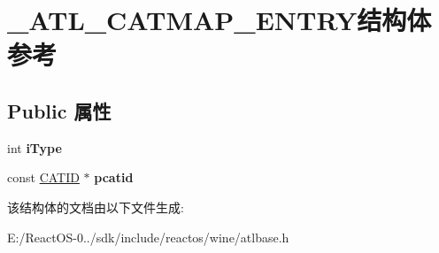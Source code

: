 \hypertarget{struct___a_t_l___c_a_t_m_a_p___e_n_t_r_y}{}\section{\+\_\+\+A\+T\+L\+\_\+\+C\+A\+T\+M\+A\+P\+\_\+\+E\+N\+T\+R\+Y结构体 参考}
\label{struct___a_t_l___c_a_t_m_a_p___e_n_t_r_y}
\subsection*{Public 属性}
\begin{DoxyCompactItemize}
\item 
\mbox{\label{struct___a_t_l___c_a_t_m_a_p___e_n_t_r_y_a9fdcb425a453337206644e94d95de69f}} 
int {\bfseries i\+Type}
\item 
\mbox{\label{struct___a_t_l___c_a_t_m_a_p___e_n_t_r_y_a474a7890d059460e6de622165be67790}} 
const \hyperlink{interface_g_u_i_d}{C\+A\+T\+ID} $\ast$ {\bfseries pcatid}
\end{DoxyCompactItemize}


该结构体的文档由以下文件生成\+:\begin{DoxyCompactItemize}
\item 
E\+:/\+React\+O\+S-\/0../sdk/include/reactos/wine/atlbase.\+h\end{DoxyCompactItemize}
